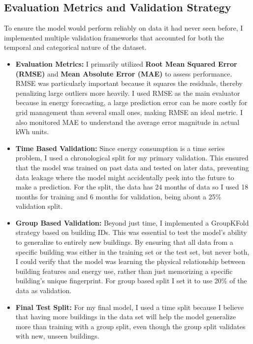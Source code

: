 \documentclass[conference]{IEEEtran}
\begin{document}
\subsection{Evaluation Metrics and Validation Strategy}
To ensure the model would perform reliably on data it had never seen before, I implemented multiple validation frameworks that accounted for both the temporal and categorical nature of the dataset.
\begin{itemize} 
\item \textbf{Evaluation Metrics:} I primarily utilized \textbf{Root Mean Squared Error (RMSE)} and \textbf{Mean Absolute Error (MAE)} to assess performance. RMSE was particularly important because it squares the residuals, thereby penalizing large outliers more heavily. I used RMSE as the main evaluator because in energy forecasting, a large prediction error can be more costly for grid management than several small ones, making RMSE an ideal metric. I also monitored MAE to understand the average error magnitude in actual kWh units.
\item \textbf{Time Based Validation:} Since energy consumption is a time series problem, I used a chronological split for my primary validation. This ensured that the model was trained on past data and tested on later data, preventing data leakage where the model might accidentally peek into the future to make a prediction. For the split, the data has 24 months of data so I used 18 months for training and 6 months for validation, being about a 25\% validation split.
\item \textbf{Group Based Validation:} Beyond just time, I implemented a GroupKFold strategy based on building IDs. This was essential to test the model's ability to generalize to entirely new buildings. By ensuring that all data from a specific building was either in the training set or the test set, but never both, I could verify that the model was learning the physical relationship between building features and energy use, rather than just memorizing a specific building's unique fingerprint. For group based split I set it to use 20\% of the data as validation.
\item \textbf{Final Test Split:} For my final model, I used a time split because I believe that having more buildings in the data set will help the model generalize more than training with a group split, even though the group split validates with new, unseen buildings. 
\end{itemize}
\end{document}
